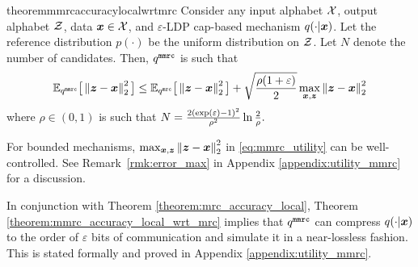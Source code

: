 \begin{restatable}{theorem}{mmrcaccuracylocalwrtmrc}\label{theorem:mmrc_accuracy_local_wrt_mrc}
Consider any input alphabet $\mathcal{X}$, output alphabet $\mathcal{Z}$, data ${\boldsymbol{x}} \in \mathcal{X}$, and $\varepsilon$-LDP cap-based mechanism $q(\cdot|{\boldsymbol{x}})$.
Let the reference distribution $p(\cdot)$ be the uniform distribution on $\mathcal{Z}$.
Let $N$ denote the number of candidates. Then, $q^{\texttt{mmrc}}$ is such that 
\begin{align}
    \mathbb{E}_{q^{\texttt{mmrc}}} \big[ \left\lVert  {\boldsymbol{z}} - {\boldsymbol{x}} \right\rVert^2_2  \big]  \leq \mathbb{E}_{q^{\texttt{mrc}}} \big[ \left\lVert  {\boldsymbol{z}} - {\boldsymbol{x}} \right\rVert^2_2  \big] + \sqrt{\frac{\rho (1+\varepsilon)}{2}}  \max_{{\boldsymbol{x}}, {\boldsymbol{z}}} \left\lVert  {\boldsymbol{z}} - {\boldsymbol{x}} \right\rVert^2_2  \label{eq:mmrc_utility}
\end{align}
 where $\rho \in (0,1)$ is such that $N = \frac{2\left(\exp(\varepsilon)-1\right)^2}{\rho^2}  \ln\frac{2}{\rho}.$
\end{restatable}
For bounded mechanisms, $\max_{{\boldsymbol{x}}, {\boldsymbol{z}}} \left\lVert  {\boldsymbol{z}} - {\boldsymbol{x}} \right\rVert^2_2$ in \eqref{eq:mmrc_utility} can be well-controlled. See Remark~\ref{rmk:error_max} in Appendix \ref{appendix:utility_mmrc} for a discussion.

In conjunction with Theorem \ref{theorem:mrc_accuracy_local}, Theorem \ref{theorem:mmrc_accuracy_local_wrt_mrc} implies that $q^{\texttt{mmrc}}$ can compress $q(\cdot|{\boldsymbol{x}})$ to the order of $\varepsilon$ bits of communication and simulate it in a near-lossless fashion. This is stated formally and proved in Appendix \ref{appendix:utility_mmrc}.